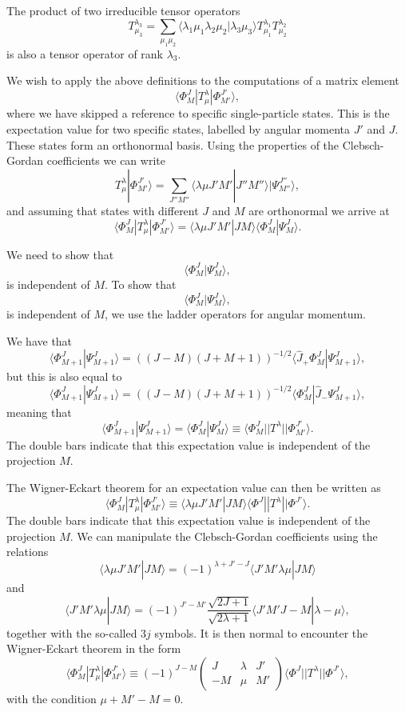 \documentclass[graybox,sectrefs,envcountresetchap,open=right]{svmonodo}
\begin{document}
The product of two irreducible tensor operators
\[
T^{\lambda_3}_{\mu_3}=\sum_{\mu_1\mu_2}\langle \lambda_1\mu_1\lambda_2\mu_2|\lambda_3\mu_3\rangle T^{\lambda_1}_{\mu_1}T^{\lambda_2}_{\mu_2}
\] 
is also a tensor operator of rank $\lambda_3$. 


We wish to apply the above definitions to the computations of a matrix element
\[
\langle \Phi^J_M|T^{\lambda}_{\mu}|\Phi^{J'}_{M'}\rangle,
\]
where we have skipped a reference to specific single-particle states. This is the expectation value for two specific states, labelled by angular momenta $J'$ and $J$. These states form an orthonormal basis.
Using the properties of the Clebsch-Gordan coefficients we can write 
\[
T^{\lambda}_{\mu}|\Phi^{J'}_{M'}\rangle=\sum_{J''M''}\langle \lambda \mu J'M'|J''M''\rangle|\Psi^{J''}_{M''}\rangle,
\]
and assuming that states with different $J$ and $M$ are orthonormal we arrive at
\[
\langle \Phi^J_M|T^{\lambda}_{\mu}|\Phi^{J'}_{M'}\rangle= \langle \lambda \mu J'M'|JM\rangle \langle \Phi^J_M|\Psi^{J}_{M}\rangle.
\]

We need to show that 
\[
\langle \Phi^J_M|\Psi^{J}_{M}\rangle,
\]
is independent of $M$.
To show that 
\[
\langle \Phi^J_M|\Psi^{J}_{M}\rangle,
\]
is independent of $M$, we use the ladder operators for angular momentum.


 We have that
\[
\langle \Phi^J_{M+1}|\Psi^{J}_{M+1}\rangle=\left((J-M)(J+M+1)\right)^{-1/2}\langle \hat{J}_{+}\Phi^J_{M}|\Psi^{J}_{M+1}\rangle,
\]
but this is also equal to 
\[
\langle \Phi^J_{M+1}|\Psi^{J}_{M+1}\rangle=\left((J-M)(J+M+1)\right)^{-1/2}\langle \Phi^J_{M}|\hat{J}_{-}\Psi^{J}_{M+1}\rangle,
\]
meaning that
\[
\langle \Phi^J_{M+1}|\Psi^{J}_{M+1}\rangle=\langle \Phi^J_M|\Psi^{J}_{M}\rangle\equiv\langle \Phi^J_{M}||T^{\lambda}||\Phi^{J'}_{M'}\rangle.
\]
The double bars indicate that this expectation value is independent of the projection $M$.


The Wigner-Eckart theorem for an expectation value can then be written as 
\[
\langle \Phi^J_M|T^{\lambda}_{\mu}|\Phi^{J'}_{M'}\rangle\equiv\langle \lambda \mu J'M'|JM\rangle\langle \Phi^J||T^{\lambda}||\Phi^{J'}\rangle.
\]
The double bars indicate that this expectation value is independent of the projection $M$.
We can manipulate the Clebsch-Gordan coefficients using the relations
\[
\langle \lambda \mu J'M'|JM\rangle= (-1)^{\lambda+J'-J}\langle J'M'\lambda \mu |JM\rangle 
\]
and
\[
\langle J'M'\lambda \mu |JM\rangle =(-1)^{J'-M'}\frac{\sqrt{2J+1}}{\sqrt{2\lambda+1}}\langle J'M'J-M |\lambda-\mu\rangle,
\]
together with the so-called $3j$ symbols.
It is then normal to encounter the Wigner-Eckart theorem in the form 
\[
\langle \Phi^J_M|T^{\lambda}_{\mu}|\Phi^{J'}_{M'}\rangle\equiv(-1)^{J-M}\left(\begin{array}{ccc}  J & \lambda & J' \\ -M & \mu & M'\end{array}\right)\langle \Phi^J||T^{\lambda}||\Phi^{J'}\rangle,
\]
with the condition $\mu+M'-M=0$.
\end{document}
